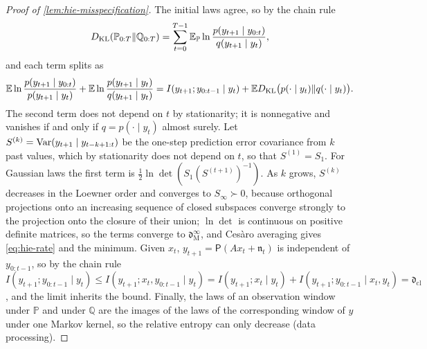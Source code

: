 \begin{proof}[Proof of \cref{lem:hie-misspecification}]
The initial laws agree, so by the chain rule
\[
D_{\mathrm{KL}}(\mathbb P_{0:T}\Vert\mathbb Q_{0:T})=\sum_{t=0}^{T-1}\mathbb{E}_{\mathbb P}\ln\frac{p(y_{t+1}\mid y_{0:t})}{q(y_{t+1}\mid y_t)},
\]
and each term splits as
\[
\mathbb{E}\ln\frac{p(y_{t+1}\mid y_{0:t})}{p(y_{t+1}\mid y_t)}+\mathbb{E}\ln\frac{p(y_{t+1}\mid y_t)}{q(y_{t+1}\mid y_t)}=I(y_{t+1};y_{0:t-1}\mid y_t)+\mathbb{E}D_{\mathrm{KL}}\bigl(p(\cdot\mid y_t)\Vert q(\cdot\mid y_t)\bigr).
\]
The second term does not depend on $t$ by stationarity; it is nonnegative and vanishes if and only if $q=p(\cdot\mid y_t)$ almost surely. Let $S^{(k)}=\operatorname{Var}(y_{t+1}\mid y_{t-k+1:t})$ be the one-step prediction error covariance from $k$ past values, which by stationarity does not depend on $t$, so that $S^{(1)}=S_1$. For Gaussian laws the first term is $\frac12\ln\det(S_1(S^{(t+1)})^{-1})$. As $k$ grows, $S^{(k)}$ decreases in the Loewner order and converges to $S_\infty\succ0$, because orthogonal projections onto an increasing sequence of closed subspaces converge strongly to the projection onto the closure of their union; $\ln\det$ is continuous on positive definite matrices, so the terms converge to $\mathfrak d^\infty_{\mathrm M}$, and Ces\`aro averaging gives \eqref{eq:hie-rate} and the minimum. Given $x_t$, $y_{t+1}=\mathsf P(Ax_t+\mathfrak n_t)$ is independent of $y_{0:t-1}$, so by the chain rule $I(y_{t+1};y_{0:t-1}\mid y_t)\le I(y_{t+1};x_t,y_{0:t-1}\mid y_t)=I(y_{t+1};x_t\mid y_t)+I(y_{t+1};y_{0:t-1}\mid x_t,y_t)=\mathfrak d_{\mathrm{cl}}$, and the limit inherits the bound. Finally, the laws of an observation window under $\mathbb P$ and under $\mathbb Q$ are the images of the laws of the corresponding window of $y$ under one Markov kernel, so the relative entropy can only decrease (data processing).
\end{proof}

